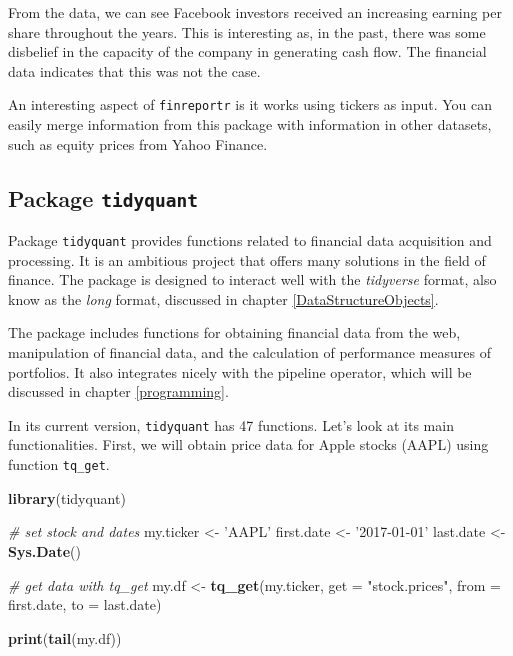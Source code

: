 \documentclass[11pt,]{book}
\newenvironment{Shaded}{\begin{snugshade}}{\end{snugshade}}
\newcommand{\KeywordTok}[1]{\textcolor[rgb]{0.27,0.27,0.27}{\textbf{#1}}}
\newcommand{\DataTypeTok}[1]{\textcolor[rgb]{0.27,0.27,0.27}{#1}}
\newcommand{\StringTok}[1]{\textcolor[rgb]{0.5,0.5,0.5}{#1}}
\newcommand{\CommentTok}[1]{\textcolor[rgb]{0.56,0.35,0.01}{\textit{#1}}}
\newcommand{\NormalTok}[1]{#1}
\begin{document}
From the data, we can see Facebook investors received an increasing
earning per share throughout the years. This is interesting as, in the
past, there was some disbelief in the capacity of the company in
generating cash flow. The financial data indicates that this was not the
case.

An interesting aspect of \texttt{finreportr} is it works using tickers
as input. You can easily merge information from this package with
information in other datasets, such as equity prices from Yahoo Finance.

\subsection{\texorpdfstring{Package
\texttt{tidyquant}}{Package tidyquant}}\label{package-tidyquant}

Package \texttt{tidyquant} provides functions related to financial data
acquisition and processing. It is an ambitious project that offers many
solutions in the field of finance. The package is designed to interact
well with the \emph{tidyverse} format, also know as the \emph{long}
format, discussed in chapter \ref{DataStructureObjects}.

The package includes functions for obtaining financial data from the
web, manipulation of financial data, and the calculation of performance
measures of portfolios. It also integrates nicely with the pipeline
operator, which will be discussed in chapter \ref{programming}.

In its current version, \texttt{tidyquant} has 47 functions. Let's look
at its main functionalities. First, we will obtain price data for Apple
stocks (AAPL) using function \texttt{tq\_get}.

\begin{Shaded}
\begin{Highlighting}[]
\KeywordTok{library}\NormalTok{(tidyquant)}

\CommentTok{# set stock and dates}
\NormalTok{my.ticker <-}\StringTok{ 'AAPL'}
\NormalTok{first.date <-}\StringTok{ '2017-01-01'}
\NormalTok{last.date <-}\StringTok{  }\KeywordTok{Sys.Date}\NormalTok{()}

\CommentTok{# get data with tq_get}
\NormalTok{my.df <-}\StringTok{ }\KeywordTok{tq_get}\NormalTok{(my.ticker,}
                \DataTypeTok{get =} \StringTok{"stock.prices"}\NormalTok{, }
                \DataTypeTok{from =}\NormalTok{ first.date, }
                \DataTypeTok{to =}\NormalTok{ last.date)}

\KeywordTok{print}\NormalTok{(}\KeywordTok{tail}\NormalTok{(my.df))}
\end{Highlighting}
\end{Shaded}
\end{document}
